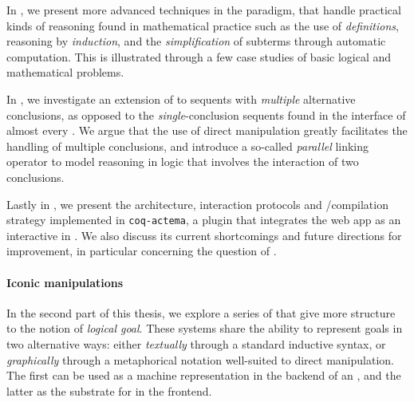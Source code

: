 In , we present more advanced techniques in the  paradigm,
that handle practical kinds of reasoning found in mathematical practice such as
the use of \emph{definitions}, reasoning by \emph{induction}, and the
\emph{simplification} of subterms through automatic computation. This is
illustrated through a few case studies of basic logical and mathematical
problems.

In , we investigate an extension of  to sequents with
\emph{multiple} alternative conclusions, as opposed to the
\emph{single}-conclusion sequents found in the interface of almost every . We
argue that the use of direct manipulation greatly facilitates the handling of
multiple conclusions, and introduce a so-called \emph{parallel} linking operator
to model reasoning in  logic that involves the interaction of two
conclusions.

Lastly in , we present the architecture, interaction protocols and
/compilation strategy implemented in \texttt{coq-actema}, a
plugin that integrates the  web app as an interactive  in .
We also discuss its current shortcomings and future directions for improvement,
in particular concerning the question of .

\paragraph{Iconic manipulations}
  
In the second part of this thesis, we explore a series of   that give more structure to the notion of \emph{logical goal}. These
systems share the ability to represent goals in two alternative ways: either
\emph{textually} through a standard inductive syntax, or \emph{graphically}
through a metaphorical notation well-suited to direct manipulation. The first
can be used as a machine representation in the backend of an , and the latter
as the substrate for  in the frontend.


